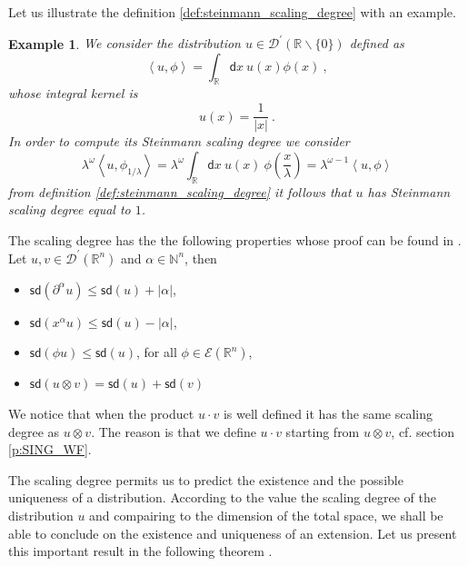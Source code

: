 \documentclass[11pt]{book}
\newcommand{\sd}{\mathsf{sd}}
\newcommand{\abs}[1]{\left|#1\right|}
\newcommand{\sm}[1]{\left\langle#1\right\rangle}
\newcommand{\Dcal}{\mathcal{D}}
\newcommand{\Ecal}{\mathcal{E}}
\newcommand{\Nbb}{\mathbb{N}}
\newcommand{\Rbb}{\mathbb{R}}
\newcommand{\dsf}{\mathsf{d}}
\theoremstyle{break}
\newtheorem{example}{Example}[chapter]
\begin{document}
Let us illustrate the definition \ref{def:steinmann_scaling_degree} with an example.


\begin{example}
We consider the distribution $u \in \Dcal^\prime(\Rbb \backslash \{0\})$ defined as 
%
\begin{equation*}
\sm{u, \phi} = \int_{\Rbb} \dsf x \ u(x) \phi(x)  \ ,
\end{equation*}
%
whose integral kernel is 
%
\begin{equation*}
u(x) = \frac{1}{\abs{x}} \ .
\end{equation*}
%
In order to compute its Steinmann scaling degree we consider
%
\begin{equation*}
\lambda^\omega \sm{u,\phi_{1/\lambda}} = \lambda^\omega \int_\Rbb \dsf x \ u(x) \ \phi\left(\frac{x}{\lambda}\right) = \lambda^{\omega-1} \sm{u , \phi} 
\end{equation*}
% 
from definition \ref{def:steinmann_scaling_degree} it follows that $u$ has Steinmann scaling degree equal to $1$.
\end{example}


The scaling degree has the the following properties whose proof can be found in \cite[theorem 5.1]{brunetti_microlocal_2000}. Let $u, v \in\Dcal^\prime(\Rbb^n)$ and $\alpha \in \Nbb^n$, then
%
\begin{itemize}
\setlength\itemsep{0pt}
\item $\sd(\partial^\alpha u) \leq \sd(u) + \abs{\alpha}$,
\item $\sd(x^\alpha u) \leq \sd(u) - \abs{\alpha}$,
\item $\sd(\phi u) \leq \sd(u)$, for all $\phi \in \Ecal(\Rbb^n)$, 
\item $\sd(u \otimes v) = \sd(u) + \sd(v)$
\end{itemize}
%
We notice that when the product $u \cdot v$ is well defined it has the same scaling degree as $u \otimes v$. The reason is that we define $u \cdot v$ starting from $u \otimes v$, cf. section \ref{p:SING_WF}.


The scaling degree permits us to predict the existence and the possible uniqueness of a distribution. According to the value the scaling degree of the distribution $u$ and compairing to the dimension of the total space, we shall be able to conclude on the existence and uniqueness of an extension. Let us present this important result in the following theorem \cite[theorems 5.2 and 5.3]{brunetti_microlocal_2000}.
\end{document}
